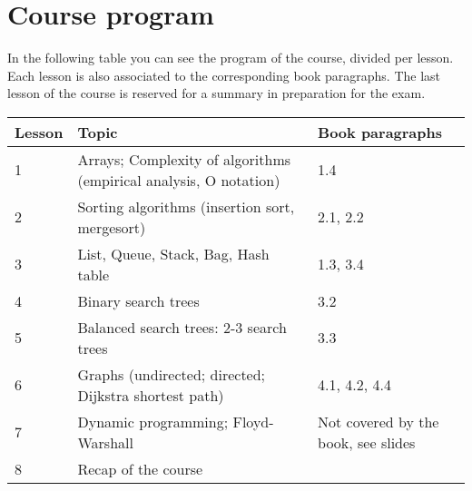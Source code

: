 \section{Course program}
	
	In the following table you can see the program of the course, divided per lesson. Each lesson is also associated to the corresponding book paragraphs. The last lesson of the course is reserved for a summary in preparation for the exam. \\
	
	\begin{tabular}{ | p{1.2cm} | p{10cm} | p{3.7cm} | }
		\hline
	  	\textbf{Lesson} & \textbf{Topic} & \textbf{Book paragraphs} \\
	  	\hline
  		1 & Arrays; Complexity of algorithms (empirical analysis, O notation) & 1.4 \\
  		\hline
  		2 & Sorting algorithms (insertion sort, mergesort) & 2.1, 2.2 \\
  		\hline
  		3 & List, Queue, Stack, Bag, Hash table & 1.3, 3.4 \\
  		\hline
  		4 & Binary search trees & 3.2 \\
  		\hline
  		5 & Balanced search trees: 2-3 search trees & 3.3 \\
  		\hline
  		6 & Graphs (undirected; directed; Dijkstra shortest path) & 4.1, 4.2, 4.4 \\
  		\hline
  		7 & Dynamic programming; Floyd-Warshall & Not covered by the book, see slides\\
  		\hline
  		8 & Recap of the course & \\
  		\hline
	\end{tabular}